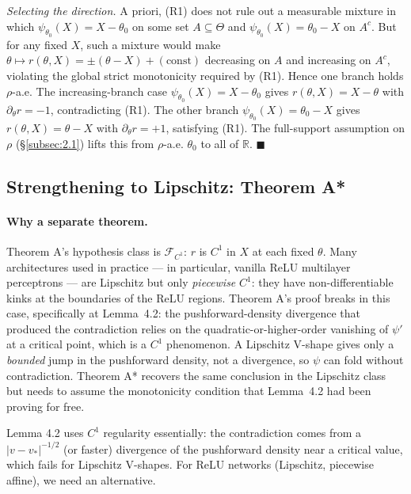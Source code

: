 \documentclass[11pt]{article}
\begin{document}
\emph{Selecting the direction.} A priori, (R1) does not rule out a
measurable mixture in which \(\psi_{\theta_0}(X) = X - \theta_0\) on
some set \(A \subseteq \Theta\) and \(\psi_{\theta_0}(X) = \theta_0 - X\)
on \(A^c\). But for any fixed \(X\), such a mixture would make
\(\theta \mapsto r(\theta, X) = \pm(\theta - X) + (\mathrm{const})\)
decreasing on \(A\) and increasing on \(A^c\), violating the global
strict monotonicity required by (R1). Hence one branch holds
\(\rho\)-a.e. The increasing-branch case \(\psi_{\theta_0}(X) = X - \theta_0\)
gives \(r(\theta, X) = X - \theta\) with \(\partial_\theta r = -1\),
contradicting (R1). The other branch
\(\psi_{\theta_0}(X) = \theta_0 - X\) gives \(r(\theta, X) = \theta - X\)
with \(\partial_\theta r = +1\), satisfying (R1). The full-support
assumption on \(\rho\) (\S\ref{subsec:2.1}) lifts this from \(\rho\)-a.e.
\(\theta_0\) to all of \(\mathbb{R}\). \(\blacksquare\)

\subsection{Strengthening to Lipschitz: Theorem A*}\label{subsec:4.4}

\paragraph{Why a separate theorem.}
Theorem A's hypothesis class is \(\mathcal{F}_{C^1}\): \(r\) is \(C^1\)
in \(X\) at each fixed \(\theta\). Many architectures used in practice
--- in particular, vanilla ReLU multilayer perceptrons --- are
Lipschitz but only \emph{piecewise} \(C^1\): they have non-differentiable
kinks at the boundaries of the ReLU regions. Theorem A's proof breaks
in this case, specifically at Lemma~4.2: the pushforward-density
divergence that produced the contradiction relies on the
quadratic-or-higher-order vanishing of \(\psi'\) at a critical point,
which is a \(C^1\) phenomenon. A Lipschitz V-shape gives only a
\emph{bounded} jump in the pushforward density, not a divergence, so
\(\psi\) can fold without contradiction. Theorem A* recovers the same
conclusion in the Lipschitz class but needs to assume the monotonicity
condition that Lemma~4.2 had been proving for free.

Lemma 4.2 uses \(C^1\) regularity essentially: the contradiction comes
from a \(|v - v_*|^{-1/2}\) (or faster) divergence of the pushforward
density near a critical value, which fails for Lipschitz V-shapes. For
ReLU networks (Lipschitz, piecewise affine), we need an alternative.
\end{document}
